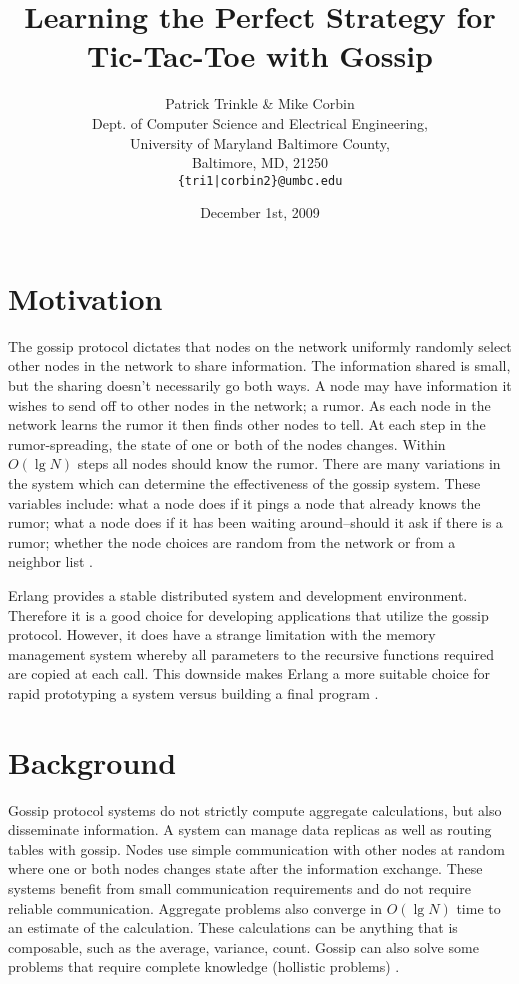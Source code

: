 \documentclass[11pt,twocolumn]{article}
\title{Learning the Perfect Strategy for Tic-Tac-Toe with Gossip}
\author{Patrick Trinkle \& Mike Corbin\\
Dept. of Computer Science and Electrical Engineering,\\
University of Maryland Baltimore County,\\
Baltimore, MD, 21250\\
\texttt{\{tri1|corbin2\}@umbc.edu}}
\date{December 1st, 2009}
\begin{document}

\section{Motivation}

The gossip protocol dictates that nodes on the network uniformly randomly select other nodes in the network to share information.  The information shared is small, but the sharing doesn't necessarily go both ways.  A node may have information it wishes to send off to other nodes in the network; a rumor.  As each node in the network learns the rumor it then finds other nodes to tell.  At each step in the rumor-spreading, the state of one or both of the nodes changes.  Within $O(\lg N)$ steps all nodes should know the rumor.  There are many variations in the system which can determine the effectiveness of the gossip system.  These variables include: what a node does if it pings a node that already knows the rumor; what a node does if it has been waiting around--should it ask if there is a rumor; whether the node choices are random from the network or from a neighbor list \cite{Birm2007}.

Erlang provides a stable distributed system and development environment.  Therefore it is a good choice for developing applications that utilize the gossip protocol.  However, it does have a strange limitation with the memory management system whereby all parameters to the recursive functions required are copied at each call.  This downside makes Erlang a more suitable choice for rapid prototyping a system versus building a final program \cite{Erlang}.

\section{Background}

Gossip protocol systems do not strictly compute aggregate calculations, but also disseminate information.  A system can manage data replicas as well as routing tables with gossip.  Nodes use simple communication with other nodes at random where one or both nodes changes state after the information exchange.  These systems benefit from small communication requirements and do not require reliable communication.  Aggregate problems also converge in $O(\lg N)$ time to an estimate of the calculation.  These calculations can be anything that is composable, such as the average, variance, count.  Gossip can also solve some problems that require complete knowledge (hollistic problems) \cite{Birm2007}.
\end{document}
